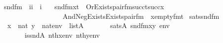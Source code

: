 \begin{isabellebody}
\isanewline
{}\isamarkupfalse%
\isanewline
\ \ snd{\isacharunderscore}{\kern0pt}fm\ {\isacharcolon}{\kern0pt}{\isacharcolon}{\kern0pt}\ {\isachardoublequoteopen}{\isacharbrackleft}{\kern0pt}i{\isacharcomma}{\kern0pt}i{\isacharbrackright}{\kern0pt}\ {\isasymRightarrow}\ i{\isachardoublequoteclose}\ \isanewline
\ \ {\isachardoublequoteopen}snd{\isacharunderscore}{\kern0pt}fm{\isacharparenleft}{\kern0pt}x{\isacharcomma}{\kern0pt}t{\isacharparenright}{\kern0pt}\ {\isasymequiv}\ Or{\isacharparenleft}{\kern0pt}Exists{\isacharparenleft}{\kern0pt}pair{\isacharunderscore}{\kern0pt}fm{\isacharparenleft}{\kern0pt}{}{\isacharcomma}{\kern0pt}succ{\isacharparenleft}{\kern0pt}t{\isacharparenright}{\kern0pt}{\isacharcomma}{\kern0pt}succ{\isacharparenleft}{\kern0pt}x{\isacharparenright}{\kern0pt}{\isacharparenright}{\kern0pt}{\isacharparenright}{\kern0pt}{\isacharcomma}{\kern0pt}\isanewline
\ \ \ \ \ \ \ \ \ \ \ \ \ \ \ \ \ \ \ And{\isacharparenleft}{\kern0pt}Neg{\isacharparenleft}{\kern0pt}Exists{\isacharparenleft}{\kern0pt}Exists{\isacharparenleft}{\kern0pt}pair{\isacharunderscore}{\kern0pt}fm{\isacharparenleft}{\kern0pt}{}{\isacharcomma}{\kern0pt}{}{\isacharcomma}{\kern0pt}{}\ {\isacharhash}{\kern0pt}{\isacharplus}{\kern0pt}\ x{\isacharparenright}{\kern0pt}{\isacharparenright}{\kern0pt}{\isacharparenright}{\kern0pt}{\isacharparenright}{\kern0pt}{\isacharcomma}{\kern0pt}empty{\isacharunderscore}{\kern0pt}fm{\isacharparenleft}{\kern0pt}t{\isacharparenright}{\kern0pt}{\isacharparenright}{\kern0pt}{\isacharparenright}{\kern0pt}{\isachardoublequoteclose}\isanewline
\isanewline
{}\isamarkupfalse%
\ sats{\isacharunderscore}{\kern0pt}snd{\isacharunderscore}{\kern0pt}fm\ {\isacharcolon}{\kern0pt}\isanewline
\ \ {\isachardoublequoteopen}{\isasymlbrakk}\ x\ {\isasymin}\ nat{\isacharsemicolon}{\kern0pt}\ y\ {\isasymin}\ nat{\isacharsemicolon}{\kern0pt}env\ {\isasymin}\ list{\isacharparenleft}{\kern0pt}A{\isacharparenright}{\kern0pt}\ {\isasymrbrakk}\ \isanewline
\ \ \ \ {\isasymLongrightarrow}\ sats{\isacharparenleft}{\kern0pt}A{\isacharcomma}{\kern0pt}\ snd{\isacharunderscore}{\kern0pt}fm{\isacharparenleft}{\kern0pt}x{\isacharcomma}{\kern0pt}y{\isacharparenright}{\kern0pt}{\isacharcomma}{\kern0pt}\ env{\isacharparenright}{\kern0pt}\ {\isasymlongleftrightarrow}\isanewline
\ \ \ \ \ \ \ \ is{\isacharunderscore}{\kern0pt}snd{\isacharparenleft}{\kern0pt}{\isacharhash}{\kern0pt}{\isacharhash}{\kern0pt}A{\isacharcomma}{\kern0pt}\ nth{\isacharparenleft}{\kern0pt}x{\isacharcomma}{\kern0pt}env{\isacharparenright}{\kern0pt}{\isacharcomma}{\kern0pt}\ nth{\isacharparenleft}{\kern0pt}y{\isacharcomma}{\kern0pt}env{\isacharparenright}{\kern0pt}{\isacharparenright}{\kern0pt}{\isachardoublequoteclose}\isanewline

\end{isabellebody}
